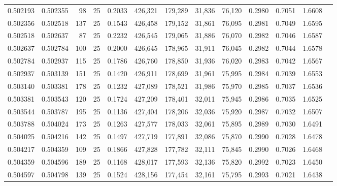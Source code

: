 \begin{tabular}{rrrrrrrrrrrrr}
0.502193 & 0.502355 &    98 &  25 &                                     0.2033 & 426,321 & 179,289 &  31,836 &  76,120 & 0.2980 & 0.7051 & 1.6608 \\
0.502356 & 0.502518 &   137 &  25 &                                     0.1543 & 426,458 & 179,152 &  31,861 &  76,095 & 0.2981 & 0.7049 & 1.6595 \\
0.502518 & 0.502637 &    87 &  25 &                                     0.2232 & 426,545 & 179,065 &  31,886 &  76,070 & 0.2982 & 0.7046 & 1.6587 \\
0.502637 & 0.502784 &   100 &  25 &                                     0.2000 & 426,645 & 178,965 &  31,911 &  76,045 & 0.2982 & 0.7044 & 1.6578 \\
0.502784 & 0.502937 &   115 &  25 &                                     0.1786 & 426,760 & 178,850 &  31,936 &  76,020 & 0.2983 & 0.7042 & 1.6567 \\
0.502937 & 0.503139 &   151 &  25 &                                     0.1420 & 426,911 & 178,699 &  31,961 &  75,995 & 0.2984 & 0.7039 & 1.6553 \\
0.503140 & 0.503381 &   178 &  25 &                                     0.1232 & 427,089 & 178,521 &  31,986 &  75,970 & 0.2985 & 0.7037 & 1.6536 \\
0.503381 & 0.503543 &   120 &  25 &                                     0.1724 & 427,209 & 178,401 &  32,011 &  75,945 & 0.2986 & 0.7035 & 1.6525 \\
0.503544 & 0.503787 &   195 &  25 &                                     0.1136 & 427,404 & 178,206 &  32,036 &  75,920 & 0.2987 & 0.7032 & 1.6507 \\
0.503788 & 0.504024 &   173 &  25 &                                     0.1263 & 427,577 & 178,033 &  32,061 &  75,895 & 0.2989 & 0.7030 & 1.6491 \\
0.504025 & 0.504216 &   142 &  25 &                                     0.1497 & 427,719 & 177,891 &  32,086 &  75,870 & 0.2990 & 0.7028 & 1.6478 \\
0.504217 & 0.504359 &   109 &  25 &                                     0.1866 & 427,828 & 177,782 &  32,111 &  75,845 & 0.2990 & 0.7026 & 1.6468 \\
0.504359 & 0.504596 &   189 &  25 &                                     0.1168 & 428,017 & 177,593 &  32,136 &  75,820 & 0.2992 & 0.7023 & 1.6450 \\
0.504597 & 0.504798 &   139 &  25 &                                     0.1524 & 428,156 & 177,454 &  32,161 &  75,795 & 0.2993 & 0.7021 & 1.6438 \\

\end{tabular}
